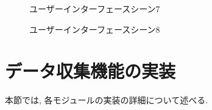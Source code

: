 \begin{figure}[htbp]
    \begin{center}
    \end{center}
    \caption{ユーザーインターフェースシーン7}
    \label{fig:seen7}
\end{figure}

\begin{figure}[htbp]
    \begin{center}
    \end{center}
    \caption{ユーザーインターフェースシーン8}
    \label{fig:seen8}
\end{figure}


\section{データ収集機能の実装}
本節では, 各モジュールの実装の詳細について述べる.

